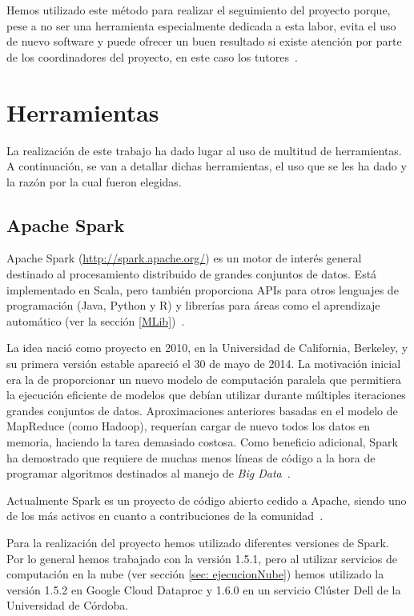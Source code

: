 Hemos utilizado este método para realizar el seguimiento del proyecto porque, pese a no ser una herramienta especialmente dedicada a esta labor, evita el uso de nuevo software y puede ofrecer un buen resultado si existe atención por parte de los coordinadores del proyecto, en este caso los tutores~\cite{WhyIssues}.


\section{Herramientas}

La realización de este trabajo ha dado lugar al uso de multitud de herramientas. A continuación, se van a detallar dichas herramientas, el uso que se les ha dado y la razón por la cual fueron elegidas.

\subsection{Apache Spark}\label{sec:DefSpark}

Apache Spark (\url{http://spark.apache.org/}) es un motor de interés general destinado al procesamiento distribuido de grandes conjuntos de datos. Está implementado en Scala, pero también proporciona APIs para otros lenguajes de programación (Java, Python y R) y librerías para áreas como el aprendizaje automático (ver la sección \ref{MLib})~\cite{SparkDoc}.

La idea nació como proyecto en 2010, en la Universidad de California, Berkeley, y su primera versión estable apareció el 30 de mayo de 2014. La motivación inicial era la de proporcionar un nuevo modelo de computación paralela que permitiera la ejecución eficiente de modelos que debían utilizar durante múltiples iteraciones grandes conjuntos de datos. Aproximaciones anteriores basadas en el modelo de MapReduce \cite{MapReducePaper} (como Hadoop), requerían cargar de nuevo todos los datos en memoria, haciendo la tarea demasiado costosa. Como beneficio adicional, Spark ha demostrado que requiere de muchas menos líneas de código a la hora de programar algoritmos destinados al manejo de \textit{Big Data}~\cite{SparkPaper}.

Actualmente Spark es un proyecto de código abierto cedido a Apache, siendo uno de los más activos en cuanto a contribuciones de la comunidad~\cite{ApacheContributions}. 

Para la realización del proyecto hemos utilizado diferentes versiones de Spark. Por lo general hemos trabajado con la versión 1.5.1, pero al utilizar servicios de computación en la nube (ver sección \ref{sec: ejecucionNube}) hemos utilizado la versión 1.5.2 en Google Cloud Dataproc y 1.6.0 en un servicio Clúster Dell de la Universidad de Córdoba.

